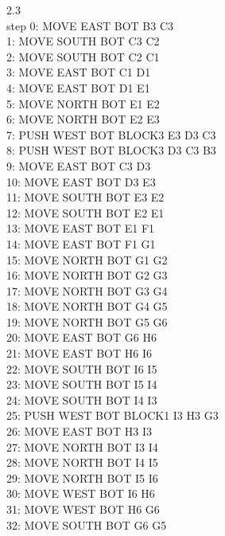 \documentclass[]{article}
\begin{document}
\begin{enumerate}[(a)]
		   2.3\\   
		   step    0: MOVE EAST BOT B3 C3\\
		           1: MOVE SOUTH BOT C3 C2\\
		           2: MOVE SOUTH BOT C2 C1\\
		           3: MOVE EAST BOT C1 D1\\
		           4: MOVE EAST BOT D1 E1\\
		           5: MOVE NORTH BOT E1 E2\\
		           6: MOVE NORTH BOT E2 E3\\
		           7: PUSH WEST BOT BLOCK3 E3 D3 C3\\
		           8: PUSH WEST BOT BLOCK3 D3 C3 B3\\
		           9: MOVE EAST BOT C3 D3\\
		          10: MOVE EAST BOT D3 E3\\
		          11: MOVE SOUTH BOT E3 E2\\
		          12: MOVE SOUTH BOT E2 E1\\
		          13: MOVE EAST BOT E1 F1\\
		          14: MOVE EAST BOT F1 G1\\
		          15: MOVE NORTH BOT G1 G2\\
		          16: MOVE NORTH BOT G2 G3\\
		          17: MOVE NORTH BOT G3 G4\\
		          18: MOVE NORTH BOT G4 G5\\
		          19: MOVE NORTH BOT G5 G6\\
		          20: MOVE EAST BOT G6 H6\\
		          21: MOVE EAST BOT H6 I6\\
		          22: MOVE SOUTH BOT I6 I5\\
		          23: MOVE SOUTH BOT I5 I4\\
		          24: MOVE SOUTH BOT I4 I3\\
		          25: PUSH WEST BOT BLOCK1 I3 H3 G3\\
		          26: MOVE EAST BOT H3 I3\\
		          27: MOVE NORTH BOT I3 I4\\
		          28: MOVE NORTH BOT I4 I5\\
		          29: MOVE NORTH BOT I5 I6\\
		          30: MOVE WEST BOT I6 H6\\
		          31: MOVE WEST BOT H6 G6\\
		          32: MOVE SOUTH BOT G6 G5\\

\end{enumerate}
\end{document}
